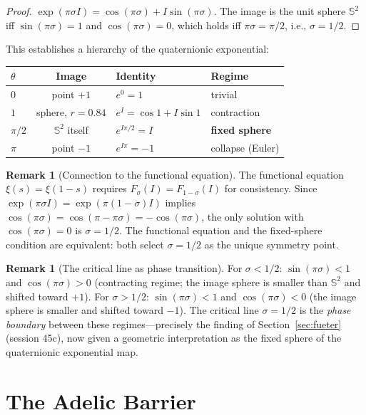 \documentclass[11pt,a4paper]{article}
\theoremstyle{definition}
\newtheorem{remark}[theorem]{Remark}
\begin{document}
\begin{proof}
$\exp(\pi\sigma I) = \cos(\pi\sigma) + I\sin(\pi\sigma)$. The image is the unit sphere $\mathbb{S}^2$ iff $\sin(\pi\sigma) = 1$ and $\cos(\pi\sigma) = 0$, which holds iff $\pi\sigma = \pi/2$, i.e., $\sigma = 1/2$.
\end{proof}

This establishes a hierarchy of the quaternionic exponential:
\begin{center}
\begin{tabular}{lcll}
\toprule
$\theta$ & Image & Identity & Regime \\
\midrule
$0$ & point $+1$ & $e^0 = 1$ & trivial \\
$1$ & sphere, $r = 0.84$ & $e^I = \cos 1 + I\sin 1$ & contraction \\
$\pi/2$ & $\mathbb{S}^2$ itself & $e^{I\pi/2} = I$ & \textbf{fixed sphere} \\
$\pi$ & point $-1$ & $e^{I\pi} = -1$ & collapse (Euler) \\
\bottomrule
\end{tabular}
\end{center}

\begin{remark}[Connection to the functional equation]
The functional equation $\xi(s) = \xi(1-s)$ requires $F_\sigma(I) = F_{1-\sigma}(I)$ for consistency. Since $\exp(\pi\sigma I) = \exp(\pi(1-\sigma)I)$ implies $\cos(\pi\sigma) = \cos(\pi - \pi\sigma) = -\cos(\pi\sigma)$, the only solution with $\cos(\pi\sigma) = 0$ is $\sigma = 1/2$. The functional equation and the fixed-sphere condition are equivalent: both select $\sigma = 1/2$ as the unique symmetry point.
\end{remark}

\begin{remark}[The critical line as phase transition]
For $\sigma < 1/2$: $\sin(\pi\sigma) < 1$ and $\cos(\pi\sigma) > 0$ (contracting regime; the image sphere is smaller than $\mathbb{S}^2$ and shifted toward $+1$). For $\sigma > 1/2$: $\sin(\pi\sigma) < 1$ and $\cos(\pi\sigma) < 0$ (the image sphere is smaller and shifted toward $-1$). The critical line $\sigma = 1/2$ is the \emph{phase boundary} between these regimes---precisely the finding of Section~\ref{sec:fueter} (session 45c), now given a geometric interpretation as the fixed sphere of the quaternionic exponential map.
\end{remark}

\section{The Adelic Barrier}
\label{sec:adelic}
\end{document}
